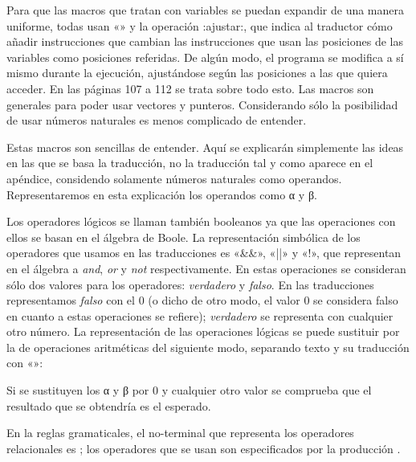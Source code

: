 Para que las macros que tratan con variables se puedan expandir de una ma\-ne\-ra uniforme, todas
usan «» y la operación {\fcode:ajustar:}, que indica al traductor cómo añadir
instrucciones que cambian las instrucciones que usan las posiciones de las variables como posiciones
referidas. De algún modo, el programa se modifica a sí mismo durante la ejecución, ajustándose según
las posiciones a las que quiera acceder. En las páginas 107 a 112 se trata sobre todo esto. Las
macros son generales para poder usar vectores y punteros. Considerando sólo la posibilidad de usar
números naturales es menos complicado de entender.

%
Estas macros son sencillas de entender. Aquí se explicarán simplemente las ideas en las que se basa
la traducción, no la traducción tal y como aparece en el apéndice, considendo solamente números
naturales como operandos. Representaremos en esta explicación los operandos como {\fgramatnoterm α}
y {\fgramatnoterm β}.

Los operadores lógicos se llaman también booleanos ya que las operaciones con ellos se basan en el
álgebra de Boole. La representación simbólica de los ope\-ra\-dores que usamos en las traducciones
es «\&\&», «||» y «!», que representan en el álgebra a {\it and}, {\it or} y {\it not}
respectivamente. En estas operaciones se consideran sólo dos valores para los operadores: {\it
verdadero} y {\it falso}. En las traducciones re\-pre\-sentamos {\it falso} con el 0 (o dicho de otro modo, el
valor 0 se considera falso en cuanto a estas operaciones se refiere); {\it verdadero} se representa
con cualquier otro número. La representación de las operaciones lógicas se puede sustituir por la de
operaciones aritméticas del siguiente modo, separando texto y su traducción con «\flechagram{}»:
\listraducciones
\noindent{}\par
\noindent{}\par
\noindent{}
\finlistatrad
Si se sustituyen los α y β por 0 y cualquier otro valor se comprueba que el resultado que se
obtendría es el esperado.

En la reglas gramaticales, el no-terminal que representa los operadores relacionales
es ; los operadores que se usan son especificados por la producción
\encaje
{} \fin .
\finencaje

